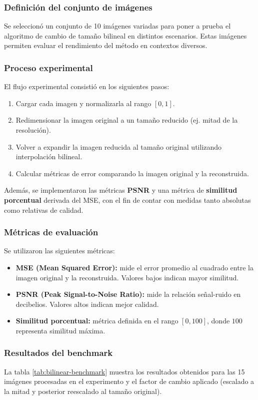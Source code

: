 \documentclass[12pt,a4paper]{article}
\begin{document}
\subsubsection{Definición del conjunto de imágenes}
Se seleccionó un conjunto de 10 imágenes variadas para poner a prueba 
el algoritmo de cambio de tamaño bilineal en distintos escenarios. 
Estas imágenes permiten evaluar el rendimiento del método en contextos diversos.

\subsubsection{Proceso experimental}
El flujo experimental consistió en los siguientes pasos:
\begin{enumerate}
    \item Cargar cada imagen y normalizarla al rango $[0,1]$.
    \item Redimensionar la imagen original a un tamaño reducido (ej. mitad de la resolución).
    \item Volver a expandir la imagen reducida al tamaño original utilizando interpolación bilineal.
    \item Calcular métricas de error comparando la imagen original y la reconstruida.
\end{enumerate}

Además, se implementaron las métricas \textbf{PSNR} y una métrica de 
\textbf{similitud porcentual} derivada del MSE, con el fin de contar 
con medidas tanto absolutas como relativas de calidad.

\subsubsection{Métricas de evaluación}
Se utilizaron las siguientes métricas:
\begin{itemize}
    \item \textbf{MSE (Mean Squared Error):} mide el error promedio al cuadrado 
    entre la imagen original y la reconstruida. Valores bajos indican mayor similitud.
    \item \textbf{PSNR (Peak Signal-to-Noise Ratio):} mide la relación señal-ruido 
    en decibelios. Valores altos indican mejor calidad.
    \item \textbf{Similitud porcentual:} métrica definida en el rango $[0,100]$, 
    donde $100$ representa similitud máxima.
\end{itemize}

\subsubsection{Resultados del benchmark}
La tabla \ref{tab:bilinear-benchmark} muestra los resultados obtenidos 
para las 15 imágenes procesadas en el experimento y el factor de cambio aplicado 
(escalado a la mitad y posterior reescalado al tamaño original).
\end{document}
